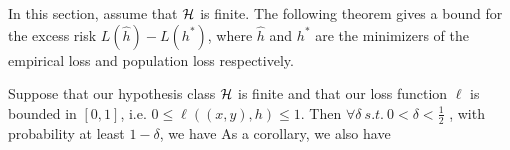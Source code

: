 
In this section, assume that $\mathcal H$ is finite. The following theorem gives a bound for the excess risk $L(\hat{h}) - L(h^{*})$, where $\hat{h}$ and $h^*$ are the minimizers of the empirical loss and population loss respectively.

\begin{theorem}\label{lec4:thm:finite}
Suppose that our hypothesis class $\mathcal H$ is finite and that our loss function $\ell$ is bounded in $[0,1]$, i.e. $0 \leq \ell((x, y), h) \leq 1$. Then $\forall \delta \  s.t. \  0 < \delta < \frac{1}{2}$ , with probability at least $1 - \delta$, we have 
As a corollary, we also have 
\end{theorem}

